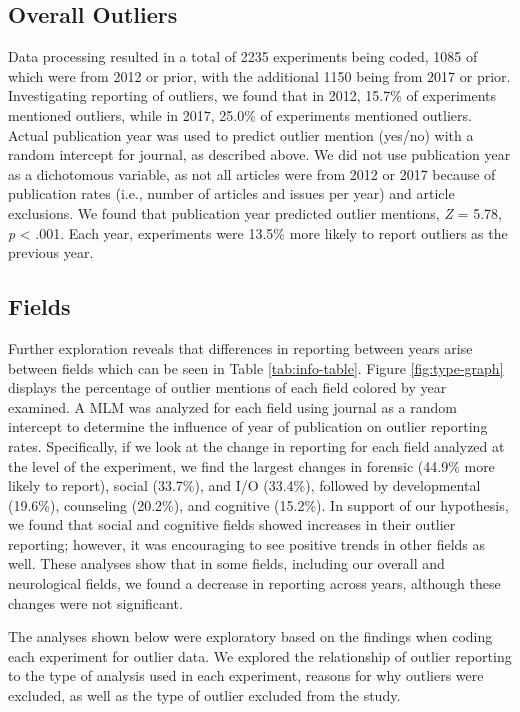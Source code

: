 \documentclass[english,man]{apa6}
\theoremstyle{definition}
\theoremstyle{definition}
\theoremstyle{definition}
\theoremstyle{remark}
\begin{document}
\subsection{Overall Outliers}\label{overall-outliers}

Data processing resulted in a total of 2235 experiments being coded,
1085 of which were from 2012 or prior, with the additional 1150 being
from 2017 or prior. Investigating reporting of outliers, we found that
in 2012, 15.7\% of experiments mentioned outliers, while in 2017, 25.0\%
of experiments mentioned outliers. Actual publication year was used to
predict outlier mention (yes/no) with a random intercept for journal, as
described above. We did not use publication year as a dichotomous
variable, as not all articles were from 2012 or 2017 because of
publication rates (i.e., number of articles and issues per year) and
article exclusions. We found that publication year predicted outlier
mentions, \emph{Z} = 5.78, \emph{p} \textless{} .001. Each year,
experiments were 13.5\% more likely to report outliers as the previous
year.

\subsection{Fields}\label{fields-1}

Further exploration reveals that differences in reporting between years
arise between fields which can be seen in Table \ref{tab:info-table}.
Figure \ref{fig:type-graph} displays the percentage of outlier mentions
of each field colored by year examined. A MLM was analyzed for each
field using journal as a random intercept to determine the influence of
year of publication on outlier reporting rates. Specifically, if we look
at the change in reporting for each field analyzed at the level of the
experiment, we find the largest changes in forensic (44.9\% more likely
to report), social (33.7\%), and I/O (33.4\%), followed by developmental
(19.6\%), counseling (20.2\%), and cognitive (15.2\%). In support of our
hypothesis, we found that social and cognitive fields showed increases
in their outlier reporting; however, it was encouraging to see positive
trends in other fields as well. These analyses show that in some fields,
including our overall and neurological fields, we found a decrease in
reporting across years, although these changes were not significant.

The analyses shown below were exploratory based on the findings when
coding each experiment for outlier data. We explored the relationship of
outlier reporting to the type of analysis used in each experiment,
reasons for why outliers were excluded, as well as the type of outlier
excluded from the study.
\end{document}
